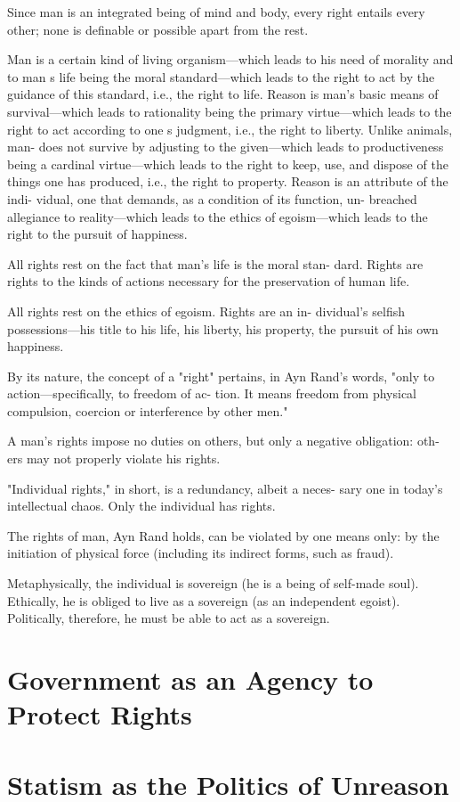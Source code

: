         Since man is an integrated being of mind and body, every right entails every other; none is definable or possible apart from the rest.

        Man is a certain kind of living organism—which leads to his need of morality and to man s life being the moral standard—which leads to the right to act by the guidance of this standard, i.e., the right to life. Reason is man's basic means of survival—which leads to rationality being the primary virtue—which leads to the right to act according to one s judgment, i.e., the right to liberty. Unlike animals, man- does not survive by adjusting to the given—which leads to productiveness being a cardinal virtue—which leads to the right to keep, use, and dispose of the things one has produced, i.e., the right to property. Reason is an attribute of the indi- vidual, one that demands, as a condition of its function, un- breached allegiance to reality—which leads to the ethics of egoism—which leads to the right to the pursuit of happiness.

        All rights rest on the fact that man's life is the moral stan- dard. Rights are rights to the kinds of actions necessary for the preservation of human life.

        All rights rest on the ethics of egoism. Rights are an in- dividual's selfish possessions—his title to his life, his liberty, his property, the pursuit of his own happiness.

        By its nature, the concept of a "right" pertains, in Ayn Rand's words, "only to action—specifically, to freedom of ac- tion. It means freedom from physical compulsion, coercion or interference by other men."
        
        A man's rights impose no duties on others, but only a negative obligation: oth- ers may not properly violate his rights.

        "Individual rights," in short, is a redundancy, albeit a neces- sary one in today's intellectual chaos. Only the individual has rights.

        The rights of man, Ayn Rand holds, can be violated by one means only: by the initiation of physical force (including its indirect forms, such as fraud).

        Metaphysically, the individual is sovereign (he is a being of self-made soul). Ethically, he is obliged to live as a sovereign (as an independent egoist). Politically, therefore, he must be able to act as a sovereign.

    \section{Government as an Agency to Protect Rights}

    \section{Statism as the Politics of Unreason}